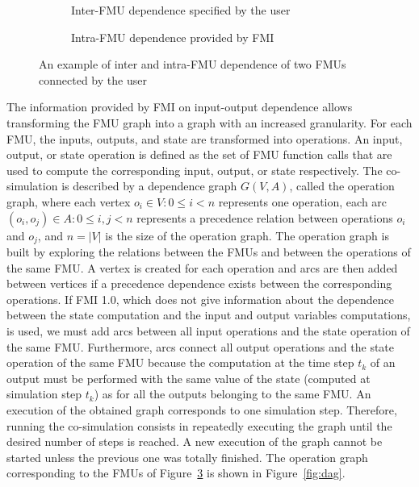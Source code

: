 \begin{figure}[htb]
\centering
\begin{subfigure}{\textwidth}
  \centering
  
  \caption{Inter-FMU dependence specified by the user}
  \label{fig:2mdlsbb}
	\vspace*{1cm}
\end{subfigure}

\begin{subfigure}{\textwidth}
  \centering
  
  \caption{Intra-FMU dependence provided by FMI}
  \label{fig:2mdlsintra}
\end{subfigure}
\caption{An example of inter and intra-FMU dependence of two FMUs connected by the user}
\label{fig:2mdls}
\end{figure}

The information provided by FMI on input-output dependence allows transforming the FMU graph into a graph with an increased granularity. For each FMU, the inputs, outputs, and state are transformed into operations. An input, output, or state operation is defined as the set of FMU function calls that are used to compute the corresponding input, output, or state respectively. The co-simulation is described by a dependence graph $G(V,A)$, called the operation graph, where each vertex $o_i \in V: 0 \leq i < n$ represents one operation, each arc $(o_i,o_j) \in A: 0 \leq i,j < n$ represents a precedence relation between operations $o_i$ and $o_j$, and $n = |V|$ is the size of the operation graph. The operation graph is built by exploring the relations between the FMUs and between the operations of the same FMU. A vertex is created for each operation and arcs are then added between vertices if a precedence dependence exists between the corresponding operations. If FMI 1.0, which does not give information about the dependence between the state computation and the input and output variables computations, is used, we must add arcs between all input operations and the state operation of the same FMU. Furthermore, arcs connect all output operations and the state operation of the same FMU because the computation at the time step $t_k$ of an output must be performed with the same value of the state (computed at simulation step $t_k$) as for all the outputs belonging to the same FMU. An execution of the obtained graph corresponds to one simulation step. Therefore, running the co-simulation consists in repeatedly executing the graph until the desired number of steps is reached. A new execution of the graph cannot be started unless the previous one was totally finished. The operation graph corresponding to the FMUs of Figure~\ref{fig:2mdls} is shown in Figure~\ref{fig:dag}.

